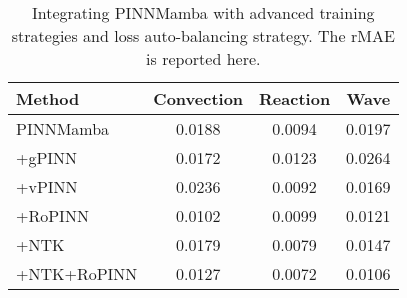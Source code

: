 \begin{table}
\vspace{-3mm}
  \caption{Integrating PINNMamba with advanced training strategies and loss auto-balancing strategy. The rMAE is reported here.}
  
  \centering
    \small
  \begin{tabular}{lccc}

    \toprule 
    Method & Convection & Reaction & Wave\\
   \midrule
   PINNMamba & 0.0188 & 0.0094 & 0.0197\\
   +gPINN & 0.0172& 0.0123 & 0.0264 \\
   +vPINN & 0.0236 & 0.0092& 0.0169\\
   +RoPINN & 0.0102& 0.0099& 0.0121\\
    \midrule
    +NTK &0.0179& 0.0079& 0.0147\\
    +NTK+RoPINN &0.0127& 0.0072& 0.0106\\
   

    \bottomrule
  \end{tabular}
  \normalsize
  \label{tab:para}
  \vspace{-6mm}
\end{table}